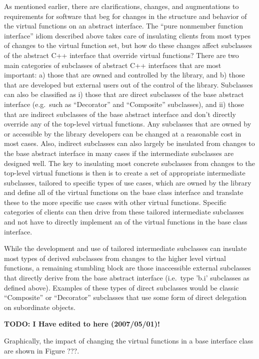 \documentclass[pdf,ps2pdf,11pt]{SANDreport}
\begin{document}
As mentioned earlier, there are clarifications, changes, and augmentations to
requirements for software that beg for changes in the structure and behavior
of the virtual functions on an abstract interface.  The ``pure nonmember
function interface'' idiom described above takes care of insulating clients
from most types of changes to the virtual function set, but how do these
changes affect subclasses of the abstract C++ interface that override virtual
functions?  There are two main categories of subclasses of abstract C++
interfaces that are most important: a) those that are owned and controlled by
the library, and b) those that are developed but external users out of the
control of the library.  Subclasses can also be classified as i) those that
are direct subclasses of the base abstract interface (e.g.\ such as
``Decorator'' and ``Composite'' subclasses), and ii) those that are indirect
subclasses of the base abstract interface and don't directly override any of
the top-level virtual functions.  Any subclasses that are owned by or
accessible by the library developers can be changed at a reasonable cost in
most cases.  Also, indirect subclasses can also largely be insulated from
changes to the base abstract interface in many cases if the intermediate
subclasses are designed well.  The key to insulating most concrete subclasses
from changes to the top-level virtual functions is then is to create a set of
appropriate intermediate subclasses, tailored to specific types of use cases,
which are owned by the library and define all of the virtual functions on the
base class interface and translate these to the more specific use cases with
other virtual functions.  Specific categories of clients can then drive from
these tailored intermediate subclasses and not have to directly implement an
of the virtual functions in the base class interface.

While the development and use of tailored intermediate subclasses can insulate
most types of derived subclasses from changes to the higher level virtual
functions, a remaining stumbling block are those inaccessible external
subclasses that directly derive from the base abstract interface (i.e.\ type
'b.i' subclasses as defined above).  Examples of these types of direct
subclasses would be classic ``Composite'' or ``Decorator'' subclasses that use
some form of direct delegation on subordinate objects.

{}\textbf{TODO: I Have edited to here (2007/05/01)!}

Graphically, the impact of changing the virtual functions in a base interface
class are shown in Figure ???.
\end{document}
